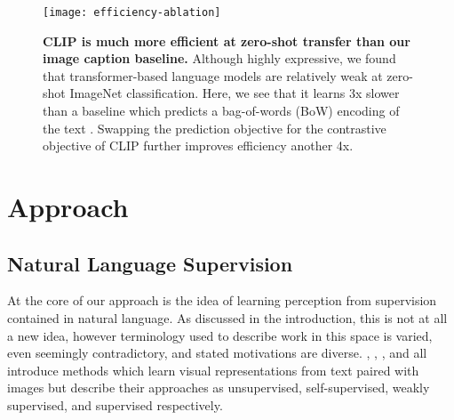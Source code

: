 \documentclass{article}
\begin{document}
\begin{figure}[t]
\begin{center}
\centerline{\texttt{[image: efficiency-ablation]}}
\caption{\textbf{CLIP is much more efficient at zero-shot transfer than our image caption baseline.} Although highly expressive, we found that transformer-based language models are relatively weak at zero-shot ImageNet classification. Here, we see that it learns 3x slower than a baseline which predicts a bag-of-words (BoW) encoding of the text \citep{joulin2016learning}. Swapping the prediction objective for the contrastive objective of CLIP further improves efficiency another 4x.}
\label{compare_objective_fig}
\end{center}
\vspace{-1em}
\end{figure}

\section{Approach}



\subsection{Natural Language Supervision}

At the core of our approach is the idea of learning perception from supervision contained in natural language. As discussed in the introduction, this is not at all a new idea, however terminology used to describe work in this space is varied, even seemingly contradictory, and stated motivations are diverse. \citet{zhang2020contrastive}, \citet{gomez2017self}, \citet{joulin2016learning}, and \citet{desai2020virtex} all introduce methods which learn visual representations from text paired with images but describe their approaches as unsupervised, self-supervised, weakly supervised, and supervised respectively.
\end{document}
